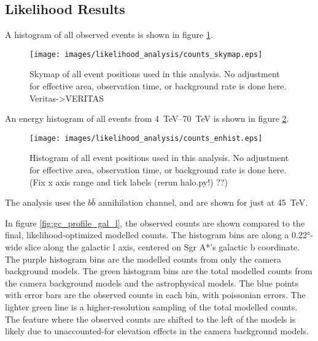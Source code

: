   \subsection{Likelihood Results}
  
  A histogram of all observed events is shown in figure \ref{fig:gc_counts_skymap}.
  
  \begin{figure}[ht]
    \centering
    \texttt{[image: images/likelihood\_analysis/counts\_skymap.eps]}
    \caption[Galactic Center Counts Skymap]{
      Skymap of all event positions used in this analysis.
      No adjustment for effective area, observation time, or background rate is done here.
      {\color{red}Veritas->VERITAS}
    }
    \label{fig:gc_counts_skymap}
  \end{figure}

  An energy histogram of all events from \SIrange{4}{70}{TeV} is shown in figure \ref{fig:gc_counts_enhist}.
  
  \begin{figure}[ht]
    \centering
    \texttt{[image: images/likelihood\_analysis/counts\_enhist.eps]}
    \caption[Galactic Center Counts Energy Histogram]{
      Histogram of all event positions used in this analysis.
      No adjustment for effective area, observation time, or background rate is done here.
      {\color{red}(Fix x axis range and tick labels (rerun halo.py!) ??)}
    }
    \label{fig:gc_counts_enhist}
  \end{figure}

  The analysis uses the $b\bar{b}$ annihilation channel, and are shown for just at \SI{45}{TeV}.

  In figure \ref{fig:gc_profile_gal_l}, the observed counts are shown compared to the final, likelihood-optimized modelled counts.
  The histogram bins are along a \ang{0.22}-wide slice along the galactic l axis, centered on Sgr A*'s galactic b coordinate.
  The purple histogram bins are the modelled counts from only the camera background models.
  The green histogram bins are the total modelled counts from the camera background models and the astrophysical models.
  The blue points with error bars are the observed counts in each bin, with poissonian errors.
  The lighter green line is a higher-resolution sampling of the total modelled counts.
  The feature where the observed counts are shifted to the left of the models is likely due to unaccounted-for elevation effects in the camera background models.
  
